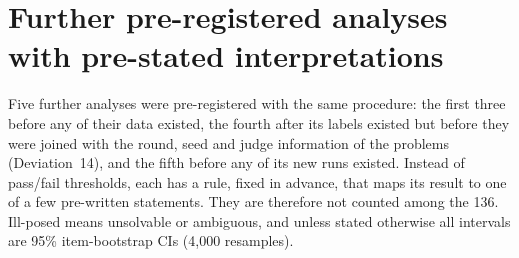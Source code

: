 \documentclass[10pt,a4paper]{article}
\begin{document}
\section*{Further pre-registered analyses with pre-stated interpretations}

Five further analyses were pre-registered with the same procedure: the first three before any of their data existed, the fourth after its labels existed but before they were joined with the round, seed and judge information of the problems (Deviation~14), and the fifth before any of its new runs existed. Instead of pass/fail thresholds, each has a rule, fixed in advance, that maps its result to one of a few pre-written statements. They are therefore not counted among the 136. Ill-posed means unsolvable or ambiguous, and unless stated otherwise all intervals are 95\% item-bootstrap CIs (4,000 resamples).
\end{document}
